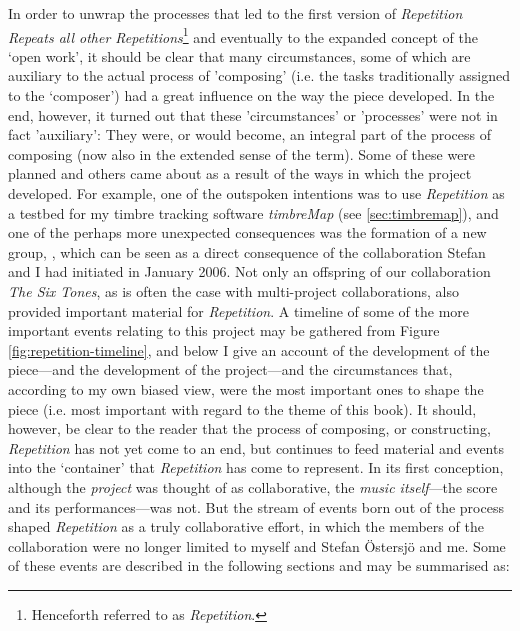 In order to unwrap the processes that led to the first version of \emph{Repetition Repeats all other   Repetitions}\footnote{Henceforth referred to as \emph{Repetition}.} and eventually to the expanded concept of the `open work', it should be clear that many circumstances, some of which are auxiliary to the actual process of 'composing' (i.e. the tasks traditionally assigned to the `composer') had a great influence on the way the piece developed. In the end, however, it turned out that these 'circumstances' or 'processes' were not in fact 'auxiliary': They were, or would become, an integral part of the process of composing (now also in the extended sense of the term). Some of these were planned and others came about as a result of the ways in which the project developed. For example, one of the outspoken intentions was to use \emph{Repetition} as a testbed for my timbre tracking software \emph{timbreMap} (see \ref{sec:timbremap}), and one of the perhaps more unexpected consequences was the formation of a new group, \emph{}, which can be seen as a direct consequence of the collaboration Stefan and I had initiated in January 2006. Not only an offspring of our collaboration \emph{The Six Tones}, as is often the case with multi-project collaborations, also provided important material for \emph{Repetition}. A timeline of some of the more important events relating to this project may be gathered from Figure \ref{fig:repetition-timeline}, and below I give an account of the development of the piece---and the development of the project---and the circumstances that, according to my own biased view, were the most important ones to shape the piece (i.e. most important with regard to the theme of this book). It should, however, be clear to the reader that the process of composing, or constructing, \emph{Repetition} has not yet come to an end, but continues to feed material and events into the `container' that \emph{Repetition} has come to represent. In its first conception, although the \emph{project} was thought of as collaborative, the \emph{music itself}---the score and its performances---was not. But the stream of events born out of the process shaped \emph{Repetition} as a truly collaborative effort, in which the members of the collaboration were no longer limited to myself and Stefan \"{O}stersj\"{o} and me. Some of these events are described in the following sections and may be summarised as:

